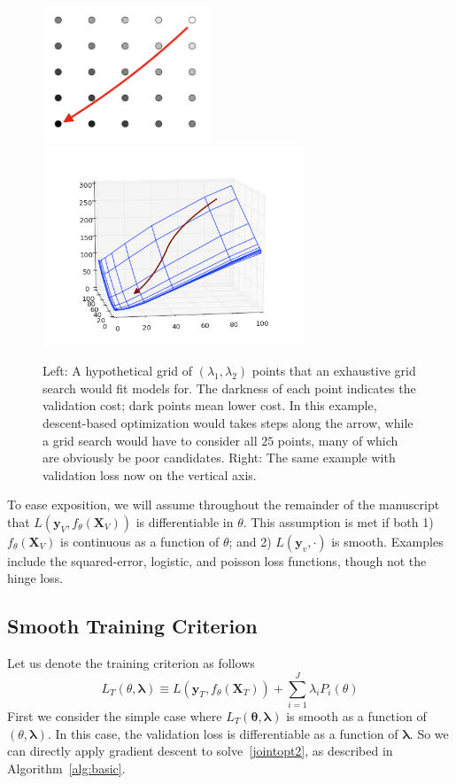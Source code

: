 \documentclass[10pt,letterpaper]{article}
\begin{document}
\begin{figure}
\begin{center}
\includegraphics[height=40mm]{grid_search_vs_descent.png}
\includegraphics[height=60mm]{surface_in_regularization_parameters.png}
\end{center}
\caption{Left: A hypothetical grid of $(\lambda_1,\lambda_2)$ points that an exhaustive grid search would fit models for. The darkness of each point indicates the validation cost; dark points mean lower cost. In this example, descent-based optimization would takes steps along the arrow, while a grid search would have to consider all $25$ points, many of which are obviously be poor candidates. Right: The same example with validation loss now on the vertical axis.}
\label{fig:compare}
\end{figure}

To ease exposition, we will assume throughout the remainder of the manuscript that $L \left( \boldsymbol{y}_V, f_{\theta}(\boldsymbol{X}_V) \right)$ is differentiable in $\theta$. This assumption is met if both 1) $f_{\theta}(\boldsymbol{X}_V)$ is continuous as a function of $\theta$; and 2) $L\left(\boldsymbol{y}_v,\cdot\right)$ is smooth. Examples include the squared-error, logistic, and poisson loss functions, though not the hinge loss.

\subsection{Smooth Training Criterion}
Let us denote the training criterion as follows
\begin{equation}
L_T\left(\theta, \boldsymbol{\lambda}\right) \equiv L(\boldsymbol{y}_T, f_\theta (\boldsymbol{X}_T)) + \sum\limits_{i=1}^J \lambda_i P_i(\theta)
\label{train}
\end{equation}
First we consider the simple case where $L_T\left(\boldsymbol \theta, \boldsymbol{\lambda}\right)$ is smooth as a function of $(\theta, \boldsymbol{\lambda})$. In this case, the validation loss is differentiable as a function of $\boldsymbol{\lambda}$. So we can directly apply gradient descent to solve~\eqref{jointopt2}, as described in Algorithm~\ref{alg:basic}.
\end{document}
